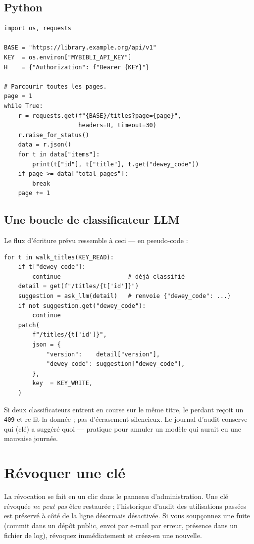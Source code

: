 \subsection{Python}

\begin{verbatim}
import os, requests

BASE = "https://library.example.org/api/v1"
KEY  = os.environ["MYBIBLI_API_KEY"]
H    = {"Authorization": f"Bearer {KEY}"}

# Parcourir toutes les pages.
page = 1
while True:
    r = requests.get(f"{BASE}/titles?page={page}",
                     headers=H, timeout=30)
    r.raise_for_status()
    data = r.json()
    for t in data["items"]:
        print(t["id"], t["title"], t.get("dewey_code"))
    if page >= data["total_pages"]:
        break
    page += 1
\end{verbatim}

\subsection{Une boucle de classificateur LLM}

Le flux d'écriture prévu ressemble à ceci — en pseudo-code :

\begin{verbatim}
for t in walk_titles(KEY_READ):
    if t["dewey_code"]:
        continue                   # déjà classifié
    detail = get(f"/titles/{t['id']}")
    suggestion = ask_llm(detail)   # renvoie {"dewey_code": ...}
    if not suggestion.get("dewey_code"):
        continue
    patch(
        f"/titles/{t['id']}",
        json = {
            "version":    detail["version"],
            "dewey_code": suggestion["dewey_code"],
        },
        key  = KEY_WRITE,
    )
\end{verbatim}

Si deux classificateurs entrent en course sur le même titre, le
perdant reçoit un \texttt{409} et re-lit la donnée ; pas
d'écrasement silencieux. Le journal d'audit conserve qui (clé)
a suggéré quoi — pratique pour annuler un modèle qui aurait eu
une mauvaise journée.

\section{Révoquer une clé}

La révocation se fait en un clic dans le panneau d'administration.
Une clé révoquée \emph{ne peut pas} être restaurée ; l'historique
d'audit des utilisations passées est préservé à côté de la ligne
désormais désactivée. Si vous soupçonnez une fuite (commit dans un
dépôt public, envoi par e-mail par erreur, présence dans un fichier
de log), révoquez immédiatement et créez-en une nouvelle.

